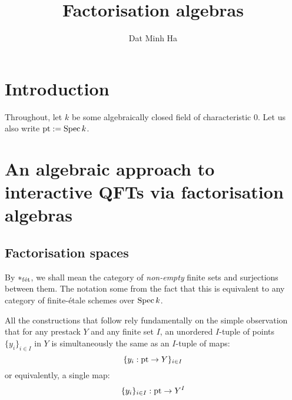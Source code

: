 

\setcounter{section}{-1}





    \title{Factorisation algebras}
    
    \author{Dat Minh Ha}
    \maketitle
    
    \begin{abstract}
        
    \end{abstract}
    
    {
      \hypersetup{} 
      \tableofcontents %
    }

    \section{Introduction}
        \begin{convention}
            Throughout, let $k$ be some algebraically closed field of characteristic $0$. Let us also write $\mathrm{pt} := \operatorname{Spec} k$.
        \end{convention}

    \section{An algebraic approach to interactive QFTs via factorisation algebras}
        \subsection{Factorisation spaces}
            \begin{convention}
                By $*_{\mathrm{f\acute{e}t}}$, we shall mean the category of \textit{non-empty} finite sets and surjections between them. The notation some from the fact that this is equivalent to any category of finite-\'etale schemes over $\operatorname{Spec} k$.
            \end{convention}

            \begin{remark}
                All the constructions that follow rely fundamentally on the simple observation that for any prestack $Y$ and any finite set $I$, an unordered $I$-tuple of points $\{y_i\}_{i \in I}$ in $Y$ is simultaneously the same as an $I$-tuple of maps:
                    $$\{y_i: \mathrm{pt} \to Y\}_{i \in I}$$
                or equivalently, a single map:
                    $$\{y_i\}_{i \in I}: \mathrm{pt} \to Y^I$$
            \end{remark}

